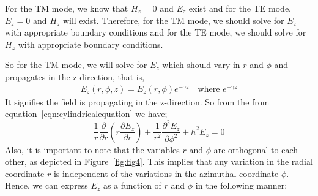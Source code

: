 For the TM mode, we know that $H_z=0$ and $E_z$ exist and for the TE mode, $E_z=0$ and $H_z$ will exist. Therefore, for the TM mode, we should solve for $E_z$ with appropriate boundary conditions and for the TE mode, we should solve for $H_z$ with appropriate boundary conditions. 

So for the TM mode, we will solve for $E_z$ which should vary in $r$ and $\phi$ and propagates in the z direction, that is,
\begin{align*}
E_z(r,\phi, z)=E_z(r,\phi)e^{-\gamma z}\quad\text{where }e^{-\gamma z}
\end{align*}
It signifies the field is propagating in the z-direction. So from the from equation~\eqref{eqn:cylindricalequation} we have;
\begin{equation}
\frac{1}{r}\frac{\partial}{\partial r}(r\frac{\partial E_z}{\partial r}) + \frac{1}{r^2}\frac{\partial^2 E_z}{\partial\phi^2} + h^2 E_z = 0 
\label{eqn12.3}
\end{equation}
Also, it is important to note that the variables $r$ and $\phi$ are orthogonal to each other, as depicted in Figure~\ref{fig:fig4}. This implies that any variation in the radial coordinate $r$ is independent of the variations in the azimuthal coordinate $\phi$. Hence, we can express $E_z$ as a function of $r$ and $\phi$ in the following manner:

